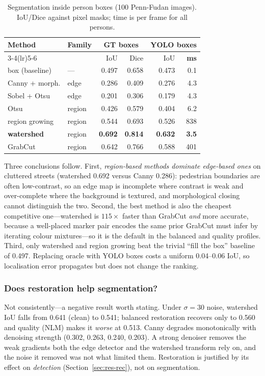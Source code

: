 \documentclass[conference,10pt]{IEEEtran}
\newcommand{\hdr}[1]{\textbf{#1}}
\begin{document}
\begin{table}[!t]
\caption{Segmentation inside person boxes (100 Penn-Fudan images). IoU/Dice
against pixel masks; time is per frame for all persons.}
\label{tab:seg}
\centering
\scriptsize
\begin{tabular}{@{}llrrrr@{}}
\toprule
\multirow{2}{*}{\hdr{Method}} & \multirow{2}{*}{\hdr{Family}} &
\multicolumn{2}{c}{\hdr{GT boxes}} & \multicolumn{2}{c}{\hdr{YOLO boxes}} \\
\cmidrule(lr){3-4}\cmidrule(lr){5-6}
 & & IoU & Dice & IoU & \hdr{ms} \\
\midrule
box (baseline)  & ---    & 0.497 & 0.658 & 0.473 & 0.1 \\
Canny + morph.  & edge   & 0.286 & 0.409 & 0.276 & 4.3 \\
Sobel + Otsu    & edge   & 0.201 & 0.306 & 0.179 & 4.3 \\
Otsu            & region & 0.426 & 0.579 & 0.404 & 6.2 \\
region growing  & region & 0.544 & 0.693 & 0.526 & 838 \\
\textbf{watershed} & region & \textbf{0.692} & \textbf{0.814} & \textbf{0.632} & \textbf{3.5} \\
GrabCut         & region & 0.642 & 0.766 & 0.588 & 401 \\
\bottomrule
\end{tabular}
\end{table}

Three conclusions follow. First, \emph{region-based methods dominate
edge-based ones} on cluttered streets (watershed 0.692 versus Canny 0.286):
pedestrian boundaries are often low-contrast, so an edge map is incomplete
where contrast is weak and over-complete where the background is textured, and
morphological closing cannot distinguish the two. Second, the best method is
also the cheapest competitive one---watershed is $115\times$ faster than
GrabCut \emph{and} more accurate, because a well-placed marker pair encodes the
same prior GrabCut must infer by iterating colour mixtures---so it is the
default in the \textsf{balanced} and \textsf{quality} profiles. Third, only
watershed and region growing beat the trivial ``fill the box'' baseline of
0.497. Replacing oracle with YOLO boxes costs a uniform 0.04--0.06 IoU, so
localisation error propagates but does not change the ranking.


\subsubsection{Does restoration help segmentation?}
Not consistently---a negative result worth stating. Under $\sigma{=}30$ noise,
watershed IoU falls from 0.641 (clean) to 0.541; \textsf{balanced} restoration
recovers only to 0.560 and \textsf{quality} (NLM) makes it \emph{worse} at
0.513. Canny degrades monotonically with denoising strength (0.302, 0.263,
0.240, 0.203). A strong denoiser removes the weak gradients both the edge
detector and the watershed transform rely on, and the noise it removed was not
what limited them. Restoration is justified by its effect on \emph{detection}
(Section~\ref{sec:res-rec}), not on segmentation.
\end{document}
